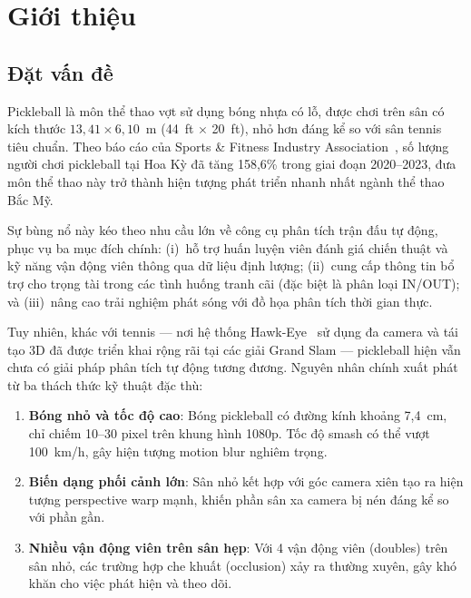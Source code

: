 \documentclass[12pt,a4paper]{article}
\begin{document}
\section{Giới thiệu}
\label{sec:intro}

\subsection{Đặt vấn đề}

Pickleball là môn thể thao vợt sử dụng bóng nhựa có lỗ, được chơi trên sân có kích thước $13{,}41 \times 6{,}10$~m (44~ft $\times$ 20~ft), nhỏ hơn đáng kể so với sân tennis tiêu chuẩn. Theo báo cáo của Sports \& Fitness Industry Association~\cite{sfia2023}, số lượng người chơi pickleball tại Hoa Kỳ đã tăng 158,6\% trong giai đoạn 2020--2023, đưa môn thể thao này trở thành hiện tượng phát triển nhanh nhất ngành thể thao Bắc Mỹ.

Sự bùng nổ này kéo theo nhu cầu lớn về công cụ phân tích trận đấu tự động, phục vụ ba mục đích chính: (i)~hỗ trợ huấn luyện viên đánh giá chiến thuật và kỹ năng vận động viên thông qua dữ liệu định lượng; (ii)~cung cấp thông tin bổ trợ cho trọng tài trong các tình huống tranh cãi (đặc biệt là phân loại IN/OUT); và (iii)~nâng cao trải nghiệm phát sóng với đồ họa phân tích thời gian thực.

Tuy nhiên, khác với tennis --- nơi hệ thống Hawk-Eye~\cite{hawkeye2024} sử dụng đa camera và tái tạo 3D đã được triển khai rộng rãi tại các giải Grand Slam --- pickleball hiện vẫn chưa có giải pháp phân tích tự động tương đương. Nguyên nhân chính xuất phát từ ba thách thức kỹ thuật đặc thù:

\begin{enumerate}[noitemsep]
    \item \textbf{Bóng nhỏ và tốc độ cao}: Bóng pickleball có đường kính khoảng 7,4~cm, chỉ chiếm 10--30 pixel trên khung hình 1080p. Tốc độ smash có thể vượt 100~km/h, gây hiện tượng motion blur nghiêm trọng.
    \item \textbf{Biến dạng phối cảnh lớn}: Sân nhỏ kết hợp với góc camera xiên tạo ra hiện tượng perspective warp mạnh, khiến phần sân xa camera bị nén đáng kể so với phần gần.
    \item \textbf{Nhiều vận động viên trên sân hẹp}: Với 4 vận động viên (doubles) trên sân nhỏ, các trường hợp che khuất (occlusion) xảy ra thường xuyên, gây khó khăn cho việc phát hiện và theo dõi.
\end{enumerate}
\end{document}
